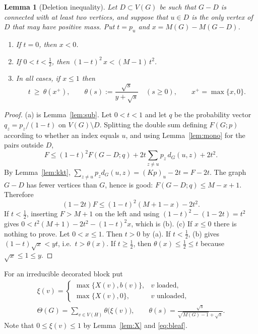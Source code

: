 \documentclass[11pt,a4paper]{article}
\newtheorem{lemma}[theorem]{Lemma}
\theoremstyle{definition}
\theoremstyle{remark}
\numberwithin{equation}{section}
\begin{document}
\begin{lemma}[Deletion inequality]\label{lem:sdel}
Let $D\subset V(G)$ be such that $G-D$ is connected with at least two vertices, and
suppose that $u\in D$ is the only vertex of $D$ that may have positive mass. Put
$t=p_u$ and $x=M(G)-M(G-D)$.
\begin{enumerate}[label=(\alph*)]
\item If $t=0$, then $x<0$.
\item If $0<t<\frac12$, then $(1-t)^2\,x<(M-1)\,t^2$.
\item In all cases, if $x\le1$ then
\[
 t\ \ge\ \theta(x^+),\qquad \theta(s):=\frac{\sqrt s}{y+\sqrt s}\quad(s\ge0),
 \qquad x^+=\max\{x,0\}.
\]
\end{enumerate}
\end{lemma}
\begin{proof}
(a) is Lemma~\ref{lem:sub}. Let $0<t<1$ and let $q$ be the probability vector
$q_z=p_z/(1-t)$ on $V(G)\setminus D$. Splitting the double sum defining
$F(G;p)$ according to whether an index equals $u$, and using
Lemma~\ref{lem:mono} for the pairs outside $D$,
\[
 F\le(1-t)^2F(G-D;q)+2t\sum_{z\ne u}p_z\,d_G(u,z)+2t^2 .
\]
By Lemma~\ref{lem:kkt}, $\sum_{z\ne u}p_zd_G(u,z)=(Kp)_u-2t=F-2t$. The graph $G-D$
has fewer vertices than $G$, hence is good: $F(G-D;q)\le M-x+1$. Therefore
\[
 (1-2t)F\le(1-t)^2(M+1-x)-2t^2 .
\]
If $t<\frac12$, inserting $F>M+1$ on the left and using
$(1-t)^2-(1-2t)=t^2$ gives $0<t^2(M+1)-2t^2-(1-t)^2x$, which is (b).
(c) If $x\le0$ there is nothing to prove. Let $0<x\le1$. Then $t>0$ by (a). If
$t<\frac12$, (b) gives $(1-t)\sqrt x<yt$, i.e.\ $t>\theta(x)$. If $t\ge\frac12$,
then $\theta(x)\le\frac12\le t$ because $\sqrt x\le1\le y$.
\end{proof}

For an irreducible decorated block put
\begin{equation}\label{eq:Theta}
\begin{gathered}
 \xi(v)=\begin{cases}\max\{X(v),b(v)\},& v\text{ loaded},\\ \max\{X(v),0\},&
 v\text{ unloaded},\end{cases}\\[4pt]
 \Theta(G)=\sum_{v\in V(H)}\theta\bigl(\xi(v)\bigr),\qquad
 \theta(s)=\frac{\sqrt s}{\sqrt{M(G)-1}+\sqrt s}.
\end{gathered}
\end{equation}
Note that $0\le\xi(v)\le1$ by Lemma~\ref{lem:X} and \eqref{eq:bleaf}.
\end{document}
